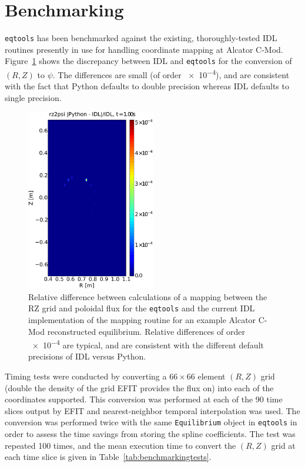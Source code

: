 \documentclass[12pt,floatfix,showpacs]{revtex4-1}
\newcommand{\eqtools}{\texttt{eqtools}\xspace}
\begin{document}
\section{Benchmarking}\label{sec:benchmark}
\eqtools has been benchmarked against the existing, thoroughly-tested IDL routines presently in use for handling coordinate mapping at Alcator C-Mod.
Figure~\ref{fig:rz2psi_diff} shows the discrepancy between IDL and \eqtools for the conversion of $(R, Z)$ to $\psi$.
The differences are small (of order \num{e-4}), and are consistent with the fact that Python defaults to double precision whereas IDL defaults to single precision.
\begin{figure}
	\includegraphics[width=0.5\textwidth]{graphics/rz2psi}
	\caption{Relative difference between calculations of a mapping between the RZ grid and poloidal flux for the \eqtools and the current IDL implementation of the mapping routine for an example Alcator C-Mod reconstructed equilibrium.  Relative differences of order \num{e-4} are typical, and are consistent with the different default precisions of IDL versus Python.}
	\label{fig:rz2psi_diff}
\end{figure}
Timing tests were conducted by converting a $66\times66$ element $(R, Z)$ grid (double the density of the grid EFIT provides the flux on) into each of the coordinates supported.
This conversion was performed at each of the 90 time slices output by EFIT and nearest-neighbor temporal interpolation was used.
The conversion was performed twice with the same \verb|Equilibrium| object in \eqtools in order to assess the time savings from storing the spline coefficients.
The test was repeated 100 times, and the mean execution time to convert the $(R, Z)$ grid at each time slice is given in Table~\ref{tab:benchmarkingtests}.
\end{document}
